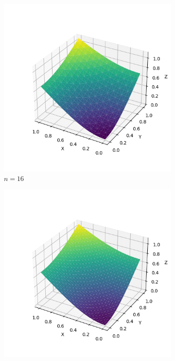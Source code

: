 \documentclass[lang=cn,a4paper,newtx,bibend=bibtex]{elegantpaper}
\begin{document}
\begin{figure}[H]
\begin{subfigure}[b]{0.18\textwidth}
      \includegraphics[width=\textwidth]{../../res_bac/res-[data|3-Dirichlet-regular-b16].png}
      \caption{$n= 16$}
  \end{subfigure}
  \hfill
  \begin{subfigure}[b]{0.18\textwidth}
      \includegraphics[width=\textwidth]{../../res_bac/res-[data|3-Dirichlet-regular-c32].png}

\end{subfigure}
\end{figure}
\end{document}

